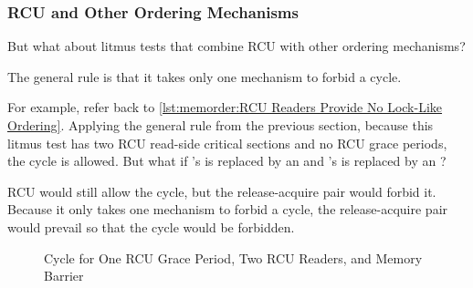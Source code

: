 \subsubsection{RCU and Other Ordering Mechanisms}
\label{sec:memorder:RCU and Other Ordering Mechanisms}

But what about litmus tests that combine RCU with other ordering
mechanisms?

The general rule is that it takes only one mechanism to forbid a cycle.

For example, refer back to
\cref{lst:memorder:RCU Readers Provide No Lock-Like Ordering}.
Applying the general rule from the previous section, because this litmus
test has two RCU read-side critical sections and no RCU grace periods,
the cycle is allowed.
But what if 's  is replaced by an
 and 's  is replaced
by an ?

RCU would still allow the cycle, but the release-acquire pair would
forbid it.
Because it only takes one mechanism to forbid a cycle, the
release-acquire pair would prevail so that the cycle would be
forbidden.

\begin{figure}[tbp]
\centering
{}
\caption{Cycle for One RCU Grace Period, Two RCU Readers, and Memory Barrier}
\label{fig:memorder:Cycle for One RCU Grace Period; Two RCU Readers; and Memory Barrier}
\end{figure}


